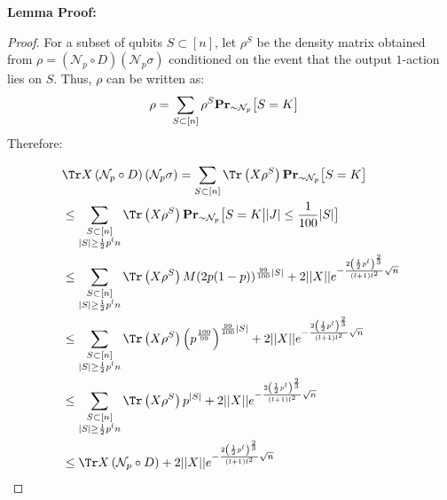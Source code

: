   \textbf{Lemma Proof:}
  \begin{proof}

    For a subset of qubits $S \subset [n]$, let $\rho^{S}$ be the density matrix obtained from $ \rho =  \left( \mathcal{N}_{p} \circ D \right) \left( \mathcal{N}_{p} \sigma \right)$ conditioned on the event that the  output $1$-action lies on $S$. Thus, $\rho$ can be written as: 
   \begin{equation*}
      \begin{split}
        & \rho = \sum_{S \subset [n]} \rho^{S}\prbm{S = K }{\sim\mathcal{N}_{p}}  
      \end{split}
    \end{equation*}
Therefore:
\newcommand*{\correctionterm}{2 || X || e^{-\frac{2\left( \frac{1}{2} p^{l} \right)^{\frac{2}{3}} }{ (l+1)l^{2} }\sqrt{n} }}

  \begin{align*}
    &   \Tr X  \left( \mathcal{N}_{p} \circ D \right)   \left( \mathcal{N}_{p} \sigma \right) =   \sum_{S \subset [n]} \Tr \left( X \rho^{S} \right) \prbm{S = K }{\sim\mathcal{N}_{p}}  \\
    & \le  \sum_{ \substack{ S \subset [n] \\ |S|\ge \frac{1}{2}p^{l} n } } \Tr \left( X \rho^{S} \right)   \prbm{S = K \big| |J| \le \frac{1}{100}|S| }{\sim\mathcal{N}_{p}}\\
    & \le  \sum_{ \substack{ S \subset [n] \\ |S|\ge \frac{1}{2}p^{l} n } } \Tr \left( X \rho^{S} \right) M(2p(1-p))^{\frac{99}{100}|S|}  
    + \correctionterm \\
    & \le  \sum_{ \substack{ S \subset [n] \\ |S|\ge \frac{1}{2}p^{l} n } } \Tr \left( X \rho^{S} \right) \left(p^{\frac{100}{99}}\right)^{\frac{99}{100}|S|}  
    + \correctionterm \\
    & \le  \sum_{ \substack{ S \subset [n] \\ |S|\ge \frac{1}{2}p^{l} n } } \Tr \left( X \rho^{S} \right) p^{|S|}  
    + \correctionterm \\
  & \le \Tr X  \left( \mathcal{N}_{p} \circ D \right) 
    + 2 || X || e^{-\frac{2\left( \frac{1}{2} p^{l} \right)^{\frac{2}{3}} }{ (l+1)l^{2} }\sqrt{n} } \\
  \end{align*}

  \end{proof}




